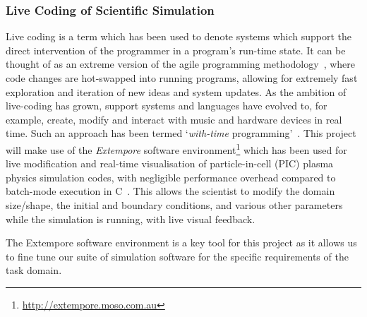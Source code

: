 \subsubsection*{Live Coding of Scientific Simulation}

Live coding is a term which has been used to denote systems which
support the direct intervention of the programmer in a program's
run-time state. It can be thought of as an extreme version of the
agile programming methodology~\parencite{fowlerAgile2001}, where
code changes are hot-swapped into running programs, allowing for
extremely fast exploration and iteration of new ideas and system
updates. As the ambition of live-coding has grown, support systems and
languages have evolved to, for example, create, modify and interact
with music and hardware devices in real time. Such an approach has
been termed `\emph{with-time}
programming'~\parencite{sorensen2010programming}. This project will
make use of the \emph{Extempore} software
environment\footnote{\url{http://extempore.moso.com.au}} which has
been used for live modification and real-time visualisation of
particle-in-cell (PIC) plasma physics simulation codes, with
negligible performance overhead compared to batch-mode execution in
C~\parencite{swiftLive2016}. This allows the scientist to modify the
domain size/shape, the initial and boundary conditions, and various
other parameters while the simulation is running, with live visual
feedback.

The Extempore software environment is a key tool for this project as
it allows us to fine tune our suite of simulation software for the
specific requirements of the task domain.


